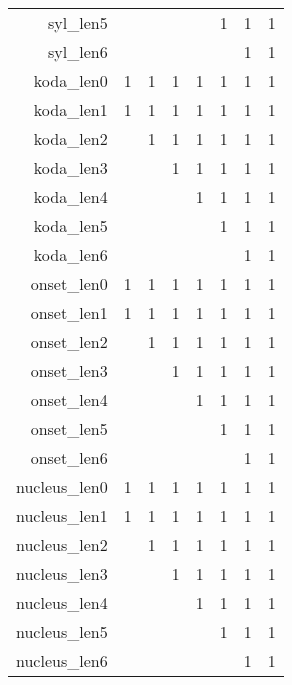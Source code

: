 \begin{longtable}{|r|llllll|c|}
    syl\_len5         & ~    & ~    & ~    & ~    & 1    & 1    & 1        \\
    syl\_len6         & ~    & ~    & ~    & ~    & ~    & 1    & 1        \\
    koda\_len0        & 1    & 1    & 1    & 1    & 1    & 1    & 1        \\
    koda\_len1        & 1    & 1    & 1    & 1    & 1    & 1    & 1        \\
    koda\_len2        & ~    & 1    & 1    & 1    & 1    & 1    & 1        \\
    koda\_len3        & ~    & ~    & 1    & 1    & 1    & 1    & 1        \\
    koda\_len4        & ~    & ~    & ~    & 1    & 1    & 1    & 1        \\
    koda\_len5        & ~    & ~    & ~    & ~    & 1    & 1    & 1        \\
    koda\_len6        & ~    & ~    & ~    & ~    & ~    & 1    & 1        \\
    onset\_len0       & 1    & 1    & 1    & 1    & 1    & 1    & 1        \\
    onset\_len1       & 1    & 1    & 1    & 1    & 1    & 1    & 1        \\
    onset\_len2       & ~    & 1    & 1    & 1    & 1    & 1    & 1        \\
    onset\_len3       & ~    & ~    & 1    & 1    & 1    & 1    & 1        \\
    onset\_len4       & ~    & ~    & ~    & 1    & 1    & 1    & 1        \\
    onset\_len5       & ~    & ~    & ~    & ~    & 1    & 1    & 1        \\
    onset\_len6       & ~    & ~    & ~    & ~    & ~    & 1    & 1        \\
    nucleus\_len0     & 1    & 1    & 1    & 1    & 1    & 1    & 1        \\
    nucleus\_len1     & 1    & 1    & 1    & 1    & 1    & 1    & 1        \\
    nucleus\_len2     & ~    & 1    & 1    & 1    & 1    & 1    & 1        \\
    nucleus\_len3     & ~    & ~    & 1    & 1    & 1    & 1    & 1        \\
    nucleus\_len4     & ~    & ~    & ~    & 1    & 1    & 1    & 1        \\
    nucleus\_len5     & ~    & ~    & ~    & ~    & 1    & 1    & 1        \\
    nucleus\_len6     & ~    & ~    & ~    & ~    & ~    & 1    & 1        \\

\end{longtable}
